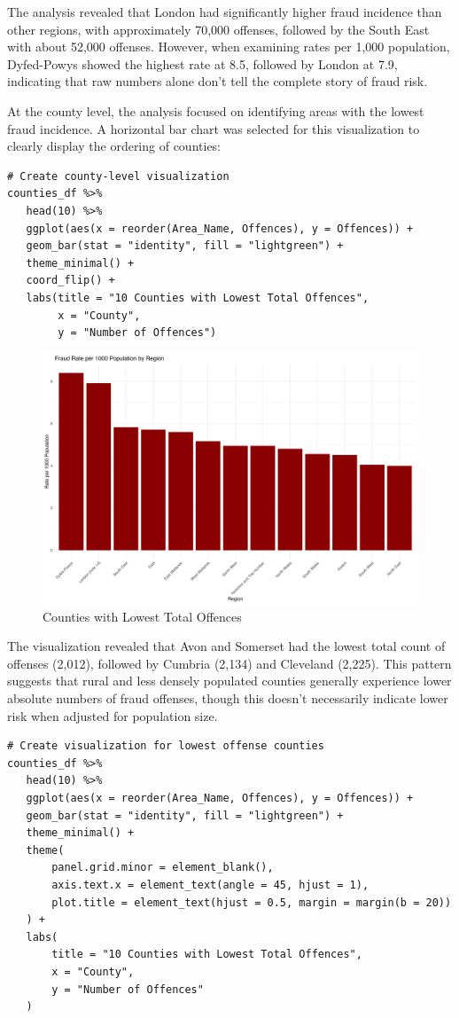 \documentclass{article}
\begin{document}
The analysis revealed that London had significantly higher fraud incidence than other regions, with approximately 70,000 offenses, followed by the South East with about 52,000 offenses. However, when examining rates per 1,000 population, Dyfed-Powys showed the highest rate at 8.5, followed by London at 7.9, indicating that raw numbers alone don't tell the complete story of fraud risk.

At the county level, the analysis focused on identifying areas with the lowest fraud incidence. A horizontal bar chart was selected for this visualization to clearly display the ordering of counties:

\begin{lstlisting}[style=RStyle, caption={County-Level Visualization}]
# Create county-level visualization
counties_df %>%
   head(10) %>%
   ggplot(aes(x = reorder(Area_Name, Offences), y = Offences)) +
   geom_bar(stat = "identity", fill = "lightgreen") +
   theme_minimal() +
   coord_flip() +
   labs(title = "10 Counties with Lowest Total Offences",
        x = "County",
        y = "Number of Offences")
\end{lstlisting}

\begin{figure}[H]
   \centering
   \includegraphics[width=0.7\linewidth]{Images/Plot5.png}
   \caption{Counties with Lowest Total Offences}
   \label{fig:county_offences}
\end{figure}

The visualization revealed that Avon and Somerset had the lowest total count of offenses (2,012), followed by Cumbria (2,134) and Cleveland (2,225). This pattern suggests that rural and less densely populated counties generally experience lower absolute numbers of fraud offenses, though this doesn't necessarily indicate lower risk when adjusted for population size.

\begin{lstlisting}[style=RStyle, caption={Enhanced County Visualization}]
# Create visualization for lowest offense counties
counties_df %>%
   head(10) %>%
   ggplot(aes(x = reorder(Area_Name, Offences), y = Offences)) +
   geom_bar(stat = "identity", fill = "lightgreen") +
   theme_minimal() +
   theme(
       panel.grid.minor = element_blank(),
       axis.text.x = element_text(angle = 45, hjust = 1),
       plot.title = element_text(hjust = 0.5, margin = margin(b = 20))
   ) +
   labs(
       title = "10 Counties with Lowest Total Offences",
       x = "County",
       y = "Number of Offences"
   )
\end{lstlisting}
\end{document}
